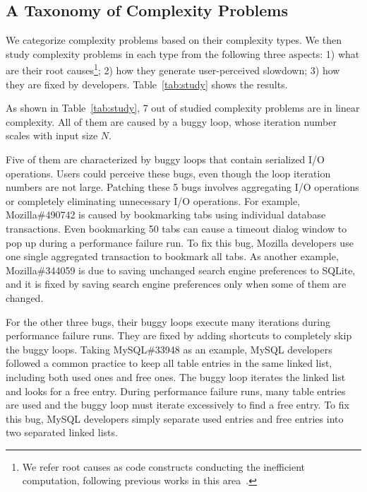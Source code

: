 \subsection{A Taxonomy of Complexity Problems}
\label{sec:tax}



We categorize complexity problems based on their complexity types.
We then study complexity problems in each type from the following three aspects:
1) what are their root causes\footnote{We refer root causes as code constructs 
conducting the inefficient computation, 
following previous works in this area~\cite{SongOOPSLA2014,ldoctor}.};
2) how they generate user-perceived slowdown;
3) how they are fixed by developers. 
Table~\ref{tab:study} shows the results. 

As shown in Table~\ref{tab:study}, 
7 out of \ComBugs studied complexity problems are in linear complexity. 
All of them are caused by a buggy loop, 
whose iteration number scales with input size $N$.

Five of them are characterized by buggy loops that contain serialized I/O operations.
Users could perceive these bugs, 
even though the loop iteration numbers are not large.
Patching these 5 bugs involves aggregating I/O operations 
or completely eliminating unnecessary I/O operations. 
For example, Mozilla\#490742 is caused by bookmarking 
tabs using individual database transactions. 
Even bookmarking 50 tabs can cause a timeout dialog 
window to pop up during a performance failure run. 
To fix this bug, Mozilla developers use one single aggregated transaction 
to bookmark all tabs.
As another example, Mozilla\#344059 is due to saving unchanged 
search engine preferences to SQLite, 
and it is fixed by saving search 
engine preferences
only when some of them are changed.

For the other three bugs,
their buggy loops execute many iterations during performance failure runs.
They are fixed by adding shortcuts to completely skip the buggy loops. 
Taking MySQL\#33948 as an example,
MySQL developers followed a common practice to keep all table entries in the same linked list, 
including both used ones and free ones. 
The buggy loop iterates the linked list and looks for a free entry.
During performance failure runs, 
many table entries are used and the buggy loop must iterate excessively to find a free entry.
To fix this bug, MySQL developers simply separate used entries and free entries 
into two separated linked lists. 


